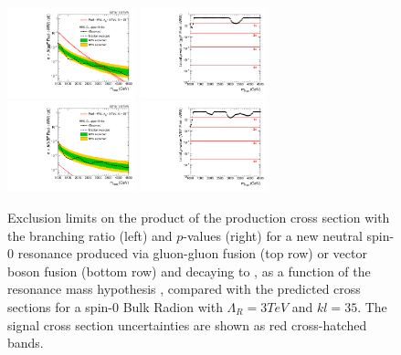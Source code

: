 \begin{figure}[htbp]
  \centering
  \includegraphics[width=0.33\textwidth]{fig/results/limits_RadToWW.pdf}
  \includegraphics[width=0.33\textwidth]{fig/results/pvalue_RadToWW.pdf}\\
  \includegraphics[width=0.33\textwidth]{fig/results/limits_VBFRadToWW.pdf}
  \includegraphics[width=0.33\textwidth]{fig/results/pvalue_VBFRadToWW.pdf}
  \caption{
    Exclusion limits on the product of the production cross section with the branching ratio (left) and $p$-values (right) for a new neutral spin-0 resonance produced via gluon-gluon fusion (top row) or vector boson fusion (bottom row) and decaying to \WW, as a function of the resonance mass hypothesis \MX, compared with the predicted cross sections for a spin-0 Bulk Radion with $\Lambda_{R}=3\unit{TeV}$ and $kl=35$.
    The signal cross section uncertainties are shown as red cross-hatched bands.
  }
  \label{fig:limits_pvalue_spin0}
\end{figure}

